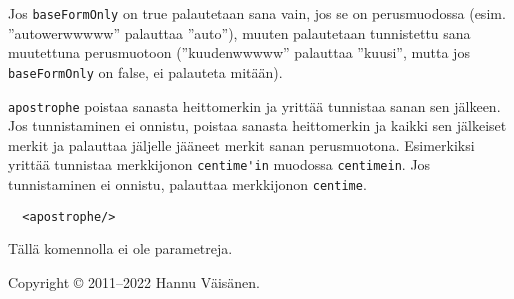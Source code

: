 \documentclass[12pt]{article}
\begin{document}
Jos \verb=baseFormOnly= on true palautetaan sana vain, jos se on
perusmuodossa (esim. ''autowerwwwww'' palauttaa ''auto''), muuten
palautetaan tunnistettu sana muutettuna perusmuotoon (''kuudenwwwww''
palauttaa ''kuusi'', mutta jos \verb=baseFormOnly= on false, ei
palauteta mitään).




\bigskip

\verb=apostrophe= poistaa sanasta heittomerkin ja yrittää tunnistaa
sanan sen jälkeen. Jos tunnistaminen ei onnistu, poistaa sanasta
heittomerkin ja kaikki sen jälkeiset merkit ja palauttaa jäljelle
jääneet merkit sanan perusmuotona. Esimerkiksi yrittää tunnistaa
merkkijonon \verb=centime'in= muodossa \verb=centimein=. Jos
tunnistaminen ei onnistu, palauttaa merkkijonon \verb=centime=.


\begin{verbatim}
  <apostrophe/>
\end{verbatim}

Tällä komennolla ei ole parametreja.


\bigskip \noindent \noindent
Copyright © 2011--2022 Hannu Väisänen.
\end{document}
